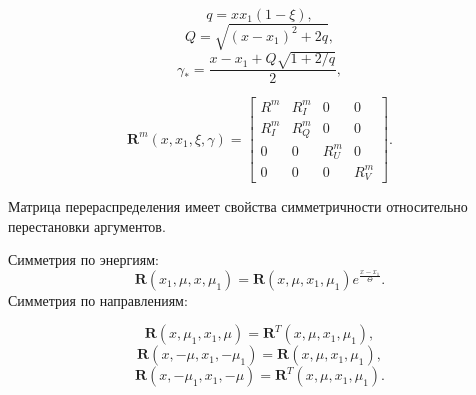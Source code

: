 \documentclass[14pt,a4paper]{extarticle}
\newcommand{\be}{\begin{equation}}
\newcommand{\ee}{\end{equation}}
\begin{document}
			$$
			q=xx_1(1-\xi),$$$$
			Q=\sqrt{(x-x_1)^2+2q},
			$$
			\be
			\gamma_*=\frac{x-x_1+Q\sqrt{1+2/q}}2,
			\ee

			\be
			\bm{R}^m(x,x_1,\xi,\gamma)= 
			\left[ {\begin{array}{cccc}
			    R^m & R^m_I & 0 & 0 \\
			     R^m_I &  R^m_Q & 0 & 0 \\
			    0 & 0 &  R^m_U & 0 \\
			    0 & 0 & 0 &  R^m_V  
			   \end{array} } \right].
			\ee



			Матрица перераспределения имеет свойства симметричности относительно перестановки аргументов.

			Симметрия по энергиям:\be
			\bm{R}(x_1,\mu,x,\mu_1)=\bm{R}(x,\mu,x_1,\mu_1) e^\frac{x-x_1}\Theta. \ee
			Симметрия по направлениям:

			\be
			\bm{R}(x,\mu_1,x_1,\mu)=\bm{R}^T(x,\mu,x_1,\mu_1), \ee
			\be
			\bm{R}(x,-\mu,x_1,-\mu_1)=\bm{R}(x,\mu,x_1,\mu_1), \ee
			\be
			\bm{R}(x,-\mu_1,x_1,-\mu)=\bm{R}^T(x,\mu,x_1,\mu_1). \ee
\end{document}
